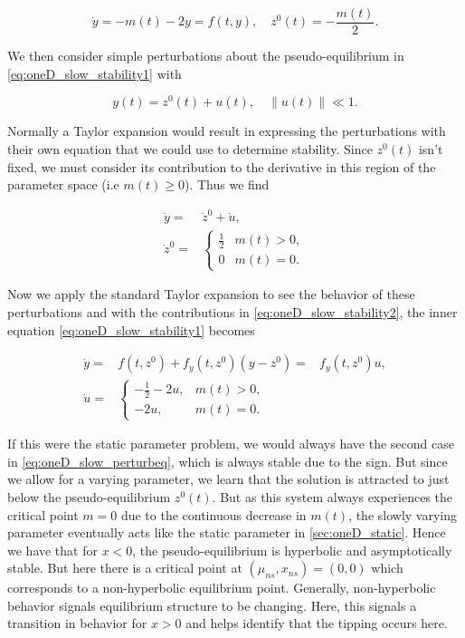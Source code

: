 \begin{equation}\label{eq:oneD_slow_stability1}
\dot{y}=-m(t)-2y=f(t,y), \quad z^0(t)=-\frac{m(t)}{2}.
\end{equation}

We then consider simple perturbations about the pseudo-equilibrium in \eqref{eq:oneD_slow_stability1} with

\begin{equation*}
y(t)=z^0(t)+u(t), \quad \lVert u(t) \rVert \ll 1.
\end{equation*}

Normally a Taylor expansion would result in expressing the perturbations with their own equation that we could use to determine stability. Since $z^0(t)$ isn't fixed, we must consider its contribution to the derivative in this region of the parameter space (i.e $m(t)\ge 0$). Thus we find

\begin{equation}\label{eq:oneD_slow_stability2}
\begin{aligned}
\dot{y} =& \dot{z}^0+\dot{u},\\
\dot{z}^0= & \begin{cases}
\frac{1}{2} & m(t)>0,\\
0 & m(t)=0.
\end{cases}
\end{aligned}
\end{equation}

Now we apply the standard Taylor expansion to see the behavior of these perturbations and with the contributions in \eqref{eq:oneD_slow_stability2}, the inner equation \eqref{eq:oneD_slow_stability1} becomes

\begin{equation}\label{eq:oneD_slow_perturbeq}
\begin{aligned}
\dot{y}=& f(t,z^0)+f_y(t,z^0)(y-z^0)
=& f_y(t,z^0)u,\\
\dot{u}=&\begin{cases}
-\frac{1}{2}-2u, & m(t)>0,\\
-2u, & m(t)=0.
\end{cases}
\end{aligned}
\end{equation}

If this were the static parameter problem, we would always have the second case in \eqref{eq:oneD_slow_perturbeq}, which is always stable due to the sign. But since we allow for a varying parameter, we learn that the solution is attracted to just below the pseudo-equilibrium $z^0(t)$. But as this system always experiences the critical point $m=0$ due to the continuous decrease in $m(t)$, the slowly varying parameter eventually acts like the static parameter in \autoref{sec:oneD_static}. Hence we have that for $x<0$, the pseudo-equilibrium is hyperbolic and asymptotically stable. But here there is a critical point at $(\mu_{ns},x_{ns})=(0,0)$ which corresponds to a non-hyperbolic equilibrium point. Generally, non-hyperbolic behavior signals equilibrium structure to be changing. Here, this signals a transition in behavior for $x>0$ and helps identify that the tipping occurs here.

